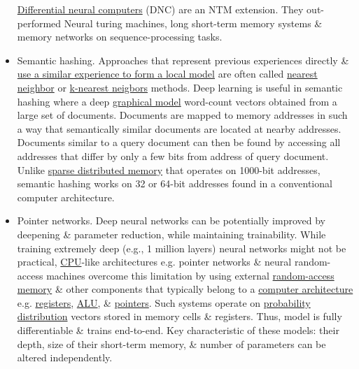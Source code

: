 \documentclass{article}
\begin{document}
\begin{itemize}
	\href{https://en.wikipedia.org/wiki/Differentiable_neural_computer}{Differential neural computers} (DNC) are an NTM extension. They out-performed Neural turing machines, long short-term memory systems \& memory networks on sequence-processing tasks.
	\item {\sf Semantic hashing.} Approaches that represent previous experiences directly \& \href{https://en.wikipedia.org/wiki/Instance-based_learning}{use a similar experience to form a local model} are often called \href{https://en.wikipedia.org/wiki/K-nearest_neighbor_algorithm}{nearest neighbor} or \href{https://en.wikipedia.org/wiki/K-nearest_neighbors_algorithm}{k-nearest neigbors} methods. Deep learning is useful in semantic hashing where a deep \href{https://en.wikipedia.org/wiki/Graphical_model}{graphical model} word-count vectors obtained from a large set of documents. Documents are mapped to memory addresses in such a way that semantically similar documents are located at nearby addresses. Documents similar to a query document can then be found by accessing all addresses that differ by only a few bits from address of query document. Unlike \href{https://en.wikipedia.org/wiki/Sparse_distributed_memory}{sparse distributed memory} that operates on 1000-bit addresses, semantic hashing works on 32 or 64-bit addresses found in a conventional computer architecture.
	\item {\sf Pointer networks.} Deep neural networks can be potentially improved by deepening \& parameter reduction, while maintaining trainability. While training extremely deep (e.g., 1 million layers) neural networks might not be practical, \href{https://en.wikipedia.org/wiki/CPU}{CPU}-like architectures e.g. pointer networks \& neural random-access machines overcome this limitation by using external \href{https://en.wikipedia.org/wiki/Random-access_memory}{random-access memory} \& other components that typically belong to a \href{https://en.wikipedia.org/wiki/Computer_architecture}{computer architecture} e.g. \href{https://en.wikipedia.org/wiki/Processor_register}{registers}, \href{https://en.wikipedia.org/wiki/Arithmetic_logic_unit}{ALU}, \& \href{https://en.wikipedia.org/wiki/Pointer_(computer_programming)}{pointers}. Such systems operate on \href{https://en.wikipedia.org/wiki/Probability_distribution}{probability distribution} vectors stored in memory cells \& registers. Thus, model is fully differentiable \& trains end-to-end. Key characteristic of these models: their depth, size of their short-term memory, \& number of parameters can be altered independently.
\end{itemize}
\end{document}
